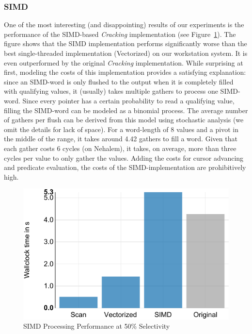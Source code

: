 \subsubsection*{SIMD}
\label{sec:simd}
One of the most interesting (and disappointing) results of our
experiments is the performance of the SIMD-based \emph{Cracking}
implementation (see Figure~\ref{fig:simd-performance}). The figure
shows that the SIMD implementation performs significantly worse than
the best single-threaded implementation (Vectorized) on our
workstation system. It is even outperformed by the original
\emph{Cracking} implementation. While surprising at first, modeling
the costs of this implementation provides a satisfying explanation:
since an SIMD-word is only flushed to the output when it is completely
filled with qualifying values, it (usually) takes multiple gathers to
process one SIMD-word. Since every pointer has a certain probability
to read a qualifying value, filling the SIMD-word can be modeled as a
binomial process. The average number of gathers per flush can be
derived from this model using stochastic analysis (we omit the details
for lack of space). For a word-length of 8 values and a pivot in the
middle of the range, it takes around 4.42 gathers to fill a
word. Given that each gather costs 6 cycles (on Nehalem), it takes, on
average, more than three cycles per value to only gather the
values. Adding the costs for cursor advancing and predicate
evaluation, the costs of the SIMD-implementation are prohibitively
high.
\begin{figure}
  \centering
  \includegraphics[width=.7\columnwidth]{Figures/damon/SingleThreadedSIMD}
  \caption{SIMD Processing Performance at 50\% Selectivity}
\vspace{-1ex}
  \label{fig:simd-performance}
\end{figure}



